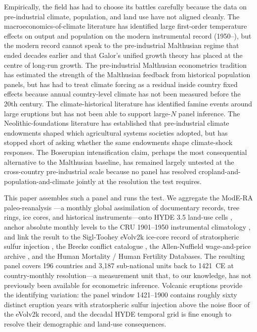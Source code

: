 \documentclass[11pt,letterpaper]{article}
\begin{document}
Empirically, the field has had to choose its battles carefully because the data on pre-industrial climate, population, and land use have not aligned cleanly. The macroeconomics-of-climate literature \citep{dell2012temperature, burke2015global, hsiang2017global} has identified large first-order temperature effects on output and population on the modern instrumental record (1950--), but the modern record cannot speak to the pre-industrial Malthusian regime that ended decades earlier and that Galor's unified growth theory \citep{galor2011unified, galor2000population} has placed at the centre of long-run growth. The pre-industrial Malthusian econometrics tradition \citep{ashraf2011dynamics, voigtlander2013how, clark2007farewell} has estimated the strength of the Malthusian feedback from historical population panels, but has had to treat climate forcing as a residual inside country fixed effects because annual country-level climate has not been measured before the 20th century. The climate-historical literature \citep{buntgen2016cooling, weiss2008climate, pages2k2019} has identified famine events around large eruptions but has not been able to support large-$N$ panel inference. The Neolithic-foundations literature \citep{matranga2024, olsson2005, diamond1997guns} has established that pre-industrial climate endowments shaped which agricultural systems societies adopted, but has stopped short of asking whether the same endowments shape climate-shock responses. The Boserupian intensification claim, perhaps the most consequential alternative to the Malthusian baseline, has remained largely untested at the cross-country pre-industrial scale because no panel has resolved cropland-and-population-and-climate jointly at the resolution the test requires.

This paper assembles such a panel and runs the test. We aggregate the ModE-RA paleo-reanalysis \citep{franke2023modera}---a monthly global assimilation of documentary records, tree rings, ice cores, and historical instruments---onto HYDE 3.5 land-use cells \citep{goldewijk2017}, anchor absolute monthly levels to the CRU 1901--1950 instrumental climatology \citep{harris2020cruts}, and link the result to the Sigl-Toohey eVolv2k ice-core record of stratospheric sulfur injection \citep{sigl2024evolv2k, toohey2017}, the Brecke conflict catalogue \citep{brecke1999}, the Allen-Nuffield wage-and-price archive \citep{allen2001divergence, malanima2002}, and the Human Mortality / Human Fertility Databases. The resulting panel covers 196 countries and 3{,}187 sub-national units back to 1421~CE at country-monthly resolution---a measurement unit that, to our knowledge, has not previously been available for econometric inference. Volcanic eruptions provide the identifying variation: the panel window 1421--1900 contains roughly sixty distinct eruption years with stratospheric sulfur injection above the noise floor of the eVolv2k record, and the decadal HYDE temporal grid is fine enough to resolve their demographic and land-use consequences.
\end{document}
